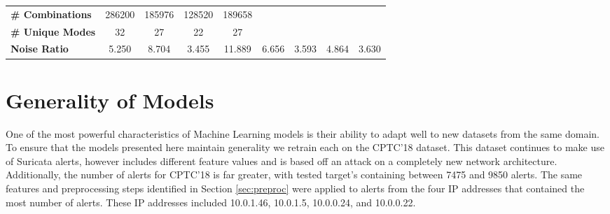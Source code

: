 \begin{table}[!htbp]
\begin{adjustbox}{angle=90}
\begin{tabular}{c|c|c|c|c|c|c|c|c}
			\multicolumn{1}{l|}{\textbf{\# Combinations}} & \multicolumn{1}{c|}{286200} & \multicolumn{1}{c|}{185976} & \multicolumn{1}{c|}{128520} & \multicolumn{1}{c|}{189658} & \multicolumn{1}{l|}{} & \multicolumn{1}{l|}{} & \multicolumn{1}{l|}{} & \multicolumn{1}{l}{} \\
			\multicolumn{1}{l|}{\textbf{\# Unique Modes}} & \multicolumn{1}{c|}{32} & \multicolumn{1}{c|}{27} & \multicolumn{1}{c|}{22} & \multicolumn{1}{c|}{27} & \multicolumn{1}{l|}{} & \multicolumn{1}{l|}{} & \multicolumn{1}{l|}{} & \multicolumn{1}{l}{} \\
			\multicolumn{1}{l|}{\textbf{Noise Ratio}} & 5.250 & 8.704 & 3.455 & 11.889 & 6.656 & 3.593 & 4.864 & 3.630
		\end{tabular}
	\end{adjustbox}
\end{table}

\section{Generality of Models}
\label{sec:cptc18}

One of the most powerful characteristics of Machine Learning models is their ability to adapt well to new datasets from the same domain. To ensure that the models presented here maintain generality we retrain each on the CPTC'18 dataset. This dataset continues to make use of Suricata alerts, however includes different feature values and is based off an attack on a completely new network architecture. Additionally, the number of alerts for CPTC'18 is far greater, with tested target's containing between 7475 and 9850 alerts. The same features and preprocessing steps identified in Section \ref{sec:preproc} were applied to alerts from the four IP addresses that contained the most number of alerts. These IP addresses included 10.0.1.46, 10.0.1.5, 10.0.0.24, and 10.0.0.22.


